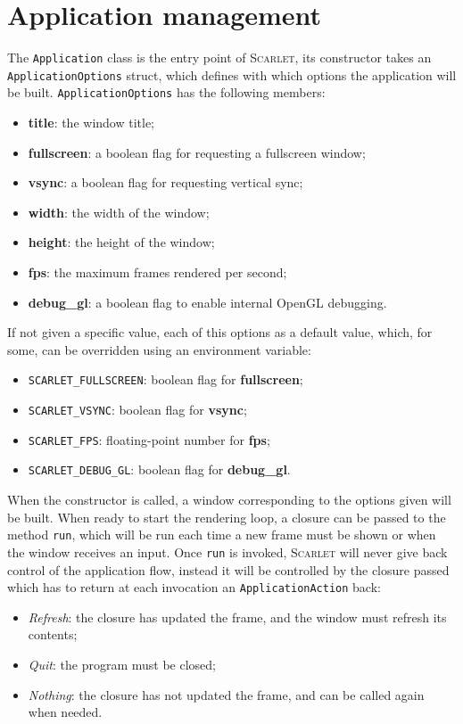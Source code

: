 \documentclass[11pt,a4paper]{report}
\begin{document}
\section{Application management}
The \texttt{Application} class is the entry point of \textsc{Scarlet}, its constructor takes an \texttt{ApplicationOptions} struct, which defines with which options the application will be built. \texttt{ApplicationOptions} has the following members:
\begin{itemize}
	\item \textbf{title}: the window title;
	\item \textbf{fullscreen}: a boolean flag for requesting a fullscreen window;
	\item \textbf{vsync}: a boolean flag for requesting vertical sync;
	\item \textbf{width}: the width of the window;
	\item \textbf{height}: the height of the window;
	\item \textbf{fps}: the maximum frames rendered per second;
	\item \textbf{debug\_gl}: a boolean flag to enable internal OpenGL debugging.
\end{itemize}

If not given a specific value, each of this options as a default value, which, for some, can be overridden using an environment variable:
\begin{itemize}
	\item \texttt{SCARLET\_FULLSCREEN}: boolean flag for \textbf{fullscreen};
	\item \texttt{SCARLET\_VSYNC}: boolean flag for \textbf{vsync};
	\item \texttt{SCARLET\_FPS}: floating-point number for \textbf{fps};
	\item \texttt{SCARLET\_DEBUG\_GL}: boolean flag for \textbf{debug\_gl}.
\end{itemize}

When the constructor is called, a window corresponding to the options given will be built. When ready to start the rendering loop, a closure can be passed to the method \texttt{run}, which will be run each time a new frame must be shown or when the window receives an input. Once \texttt{run} is invoked, \textsc{Scarlet} will never give back control of the application flow, instead it will be controlled by the closure passed which has to return at each invocation an \texttt{ApplicationAction} back:
\begin{itemize}
	\item \textit{Refresh}: the closure has updated the frame, and the window must refresh its contents;
	\item \textit{Quit}: the program must be closed;
	\item \textit{Nothing}: the closure has not updated the frame, and can be called again when needed.
\end{itemize}
\end{document}
